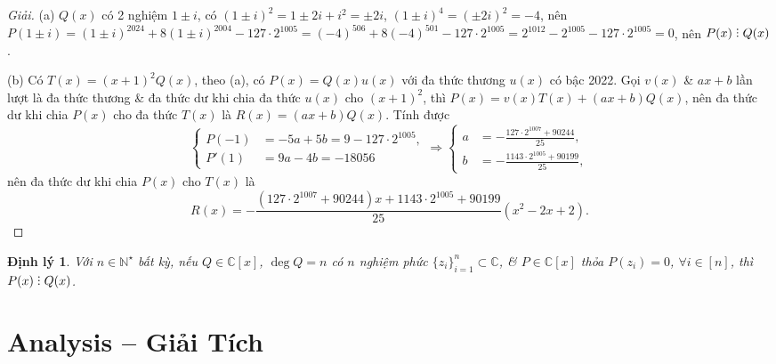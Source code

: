 \documentclass{article}
\newtheorem{dinhly}{Định lý}
\DeclareRobustCommand{\divby}{%
	\mathrel{\vbox{\baselineskip.65ex\lineskiplimit0pt\hbox{.}\hbox{.}\hbox{.}}}%
}
\begin{document}
\begin{proof}[Giải]
	(a) $Q(x)$ có 2 nghiệm $1\pm i$, có $(1\pm i)^2 = 1\pm2i + i^2 = \pm2i$, $(1\pm i)^4 = (\pm2i)^2 = -4$, nên $P(1\pm i) = (1\pm i)^{2024} + 8(1\pm i)^{2004} - 127\cdot2^{1005} = (-4)^{506} + 8(-4)^{501} - 127\cdot2^{1005} = 2^{1012} - 2^{1005} - 127\cdot2^{1005} = 0$, nên $P(x)\divby Q(x)$.
	\item(b) Có $T(x) = (x + 1)^2Q(x)$, theo (a), có $P(x) = Q(x)u(x)$ với đa thức thương $u(x)$ có bậc 2022. Gọi $v(x)$ \& $ax + b$ lần lượt là đa thức thương \& đa thức dư khi chia đa thức $u(x)$ cho $(x + 1)^2$, thì $P(x) = v(x)T(x) + (ax + b)Q(x)$, nên đa thức dư khi chia $P(x)$ cho đa thức $T(x)$ là $R(x) = (ax + b)Q(x)$. Tính được
	\begin{equation*}
		\left\{\begin{split}
			P(-1) &= -5a + 5b = 9 - 127\cdot2^{1005},\\
			P'(1) &= 9a - 4b = -18056
		\end{split}\right.\Rightarrow\left\{\begin{split}
			a &= -\frac{127\cdot2^{1007} + 90244}{25},\\
			b &= -\frac{1143\cdot2^{1005} + 90199}{25},
		\end{split}\right.		
	\end{equation*}
	nên đa thức dư khi chia $P(x)$ cho $T(x)$ là
	\begin{equation*}
		R(x) = -\frac{(127\cdot2^{1007} + 90244)x + 1143\cdot2^{1005} + 90199}{25}(x^2 - 2x + 2).
	\end{equation*}
\end{proof}

\begin{dinhly}
	Với $n\in\mathbb{N}^\star$ bất kỳ, nếu $Q\in\mathbb{C}[x]$, $\deg Q = n$ có $n$ nghiệm phức $\{z_i\}_{i=1}^n\subset\mathbb{C}$, \& $P\in\mathbb{C}[x]$ thỏa $P(z_i) = 0$, $\forall i\in[n]$, thì $P(x)\divby Q(x)$.
\end{dinhly}


\section{Analysis -- Giải Tích}

\end{document}
